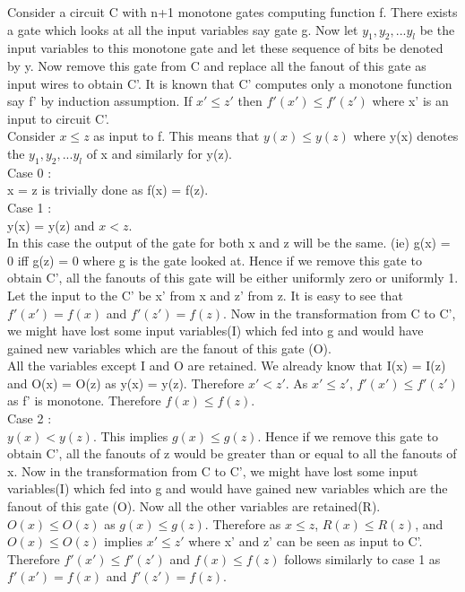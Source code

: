 \documentclass[12pt]{exam}
\begin{document}
\begin{questions}
\begin{solution}
\begin{parts}
Consider a circuit C with n+1 monotone gates computing function f.
There exists a gate which
looks at all the input variables say gate g. Now let $y_1, y_2, ... y_l$
be the input variables to this monotone gate and let these sequence of
bits be denoted by y. Now remove
this gate from C and replace
all the fanout of this gate as input wires to obtain C'.
It is known that C' computes only a monotone function say f'
by induction assumption.
If $x' \le z'$ then $f'(x') \le f'(z')$ where x' is an input to
circuit C'.\\
Consider $x \le z$ as input to f. This means that $y(x) \le y(z)$
where y(x) denotes the $y_1, y_2, ... y_l$ of x and similarly
for y(z).\\

Case 0 :\\
x = z is trivially done as f(x) = f(z).\\

Case 1 :\\
y(x) = y(z) and $x < z$.\\
In this case the output of the gate for both x and z will be the same.
(ie) g(x) = 0 iff g(z) = 0 where g is the gate looked at.
Hence if we remove this gate to obtain C', all the fanouts
of this gate will be either uniformly zero or uniformly 1.
Let the input to the C' be x' from x and z' from z.
It is easy to see that $f'(x') = f(x)$ and $f'(z') = f(z)$.
Now in the transformation from C to C', we might have lost some
input variables(I) which fed into g and would have gained new
variables which are the fanout of this gate (O).\\
All the variables except I and O are retained. We already know
that I(x) = I(z) and O(x) = O(z) as y(x) = y(z). Therefore
$x' < z'$. As $x' \le z'$, $f'(x') \le f'(z')$ as f' is monotone.
Therefore $f(x) \le f(z)$.\\

Case 2 :\\
$y(x) < y(z)$.
This implies $g(x) \le g(z)$. Hence if we remove this
gate to obtain C', all the fanouts of z would be greater
than or equal to all the fanouts of x. Now in the transformation from C to C', we
might have lost some input variables(I) which fed into g and would have gained new
variables which are the fanout of this gate (O). Now all the other
variables are retained(R). $O(x) \le O(z)$ as $g(x) \le g(z)$. Therefore
as $x \le z$, $R(x) \le R(z)$, and $O(x) \le O(z)$ implies $x'\le z'$
where x' and z' can be seen as input to C'. Therefore $f'(x') \le f'(z')$
and $f(x) \le f(z)$ follows similarly to case 1 as $f'(x') = f(x)$
and $f'(z') = f(z)$.\\


\end{parts}
\end{solution}
\end{questions}
\end{document}
